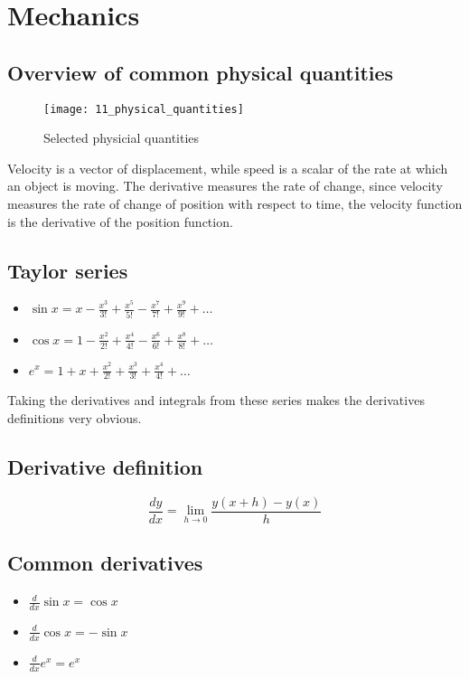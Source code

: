 \section{Mechanics}

\subsection{Overview of common physical quantities}

\begin{figure}[H]
\centering
    \texttt{[image: 11\_physical\_quantities]}
\caption{Selected physicial quantities}
\label{fig:physical-quantities}
\end{figure}

Velocity is a vector of displacement, while speed is a scalar of the rate at which an object is moving. The derivative measures the rate of change, since velocity measures the rate of change of position with respect to time, the velocity function is the derivative of the position function.

\subsection{Taylor series}

\begin{itemize}
	\item $\sin x = x - \frac{x^3}{3!} + \frac{x^5}{5!} - \frac{x^7}{7!} + \frac{x^9}{9!} + \dots$
	\item $\cos x = 1 - \frac{x^2}{2!} + \frac{x^4}{4!} - \frac{x^6}{6!} + \frac{x^8}{8!} + \dots$
	\item $e^x = 1 + x + \frac{x^2}{2!} + \frac{x^3}{3!} + \frac{x^4}{4!} + \dots$
\end{itemize}

Taking the derivatives and integrals from these series makes the derivatives definitions very obvious.

\subsection{Derivative definition}

$$\frac{dy}{dx}=\lim_{h \to 0} \frac{y(x+h)-y(x)}{h}$$

\subsection{Common derivatives}

\begin{itemize}
	\item $\frac{d}{dx}\sin x = \cos x$
	\item $\frac{d}{dx}\cos x = -\sin x$
	\item $\frac{d}{dx}e^x = e^x$
\end{itemize}